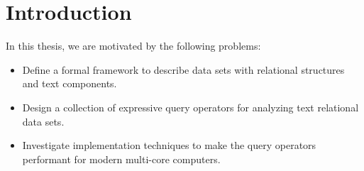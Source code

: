 



\chapter{Introduction}
	In this thesis, we are motivated by the following problems:
	
	\begin{itemize}
		\item Define a formal framework to describe data sets with relational structures and text components.
		\item Design a collection of expressive query operators for analyzing text relational data sets.
		\item Investigate implementation techniques to make the query operators performant for modern multi-core computers.
	\end{itemize}